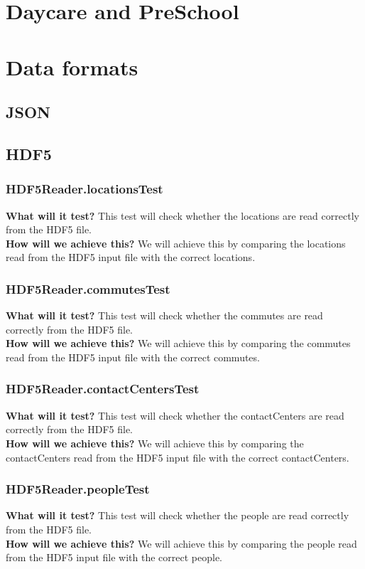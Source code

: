 \documentclass{article}
\begin{document}
\section{Daycare and PreSchool}
\section{Data formats}
\subsection{JSON}
\subsection{HDF5}
\subsubsection{HDF5Reader.locationsTest}
\textbf{What will it test?}
This test will check whether the locations are read correctly from the HDF5 file. \\
\newline
\textbf{How will we achieve this?}
We will achieve this by comparing the locations read from the HDF5 input file with the correct locations.

\subsubsection{HDF5Reader.commutesTest}
\textbf{What will it test?}
This test will check whether the commutes are read correctly from the HDF5 file. \\
\newline
\textbf{How will we achieve this?}
We will achieve this by comparing the commutes read from the HDF5 input file with the correct commutes.

\subsubsection{HDF5Reader.contactCentersTest}
\textbf{What will it test?}
This test will check whether the contactCenters are read correctly from the HDF5 file. \\
\newline
\textbf{How will we achieve this?}
We will achieve this by comparing the contactCenters read from the HDF5 input file with the correct contactCenters.

\subsubsection{HDF5Reader.peopleTest}
\textbf{What will it test?}
This test will check whether the people are read correctly from the HDF5 file. \\
\newline
\textbf{How will we achieve this?}
We will achieve this by comparing the people read from the HDF5 input file with the correct people.
\end{document}
